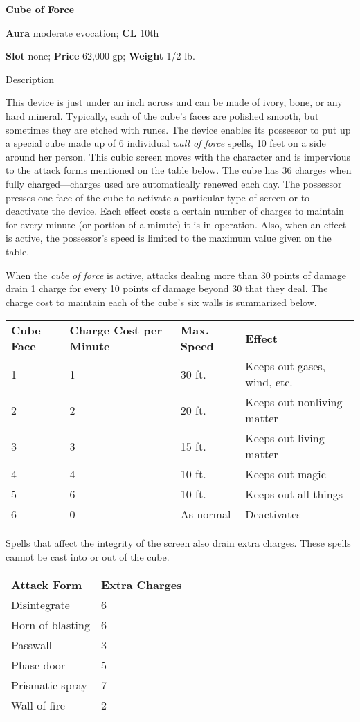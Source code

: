 \textbf{Cube of Force}
				
\textbf{Aura} moderate evocation;\textbf{ CL }10th
				
\textbf{Slot} none; \textbf{Price} 62,000 gp; \textbf{Weight }1/2 lb.
				
Description
				
This device is just under an inch across and can be made of ivory, bone, or any hard mineral. Typically, each of the cube's faces are polished smooth, but sometimes they are etched with runes. The device enables its possessor to put up a special cube made up of 6 individual \textit{wall of force }spells, 10 feet on a side around her person. This cubic screen moves with the character and is impervious to the attack forms mentioned on the table below. The cube has 36 charges when fully charged---charges used are automatically renewed each day. The possessor presses one face of the cube to activate a particular type of screen or to deactivate the device. Each effect costs a certain number of charges to maintain for every minute (or portion of a minute) it is in operation. Also, when an effect is active, the possessor's speed is limited to the maximum value given on the table.
				
When the \textit{cube of force }is active, attacks dealing more than 30 points of damage drain 1 charge for every 10 points of damage beyond 30 that they deal. The charge cost to maintain each of the cube's six walls is summarized below.

\begin{tabular}{llll}
\textbf{Cube Face} & \textbf{Charge Cost per Minute} & \textbf{Max. Speed} & \textbf{Effect}\\
1 & 1 & 30 ft. & Keeps out gases, wind, etc.\\
2 & 2 & 20 ft. & Keeps out nonliving matter\\
3 & 3 & 15 ft. & Keeps out living matter\\
4 & 4 & 10 ft. & Keeps out magic\\
5 & 6 & 10 ft. & Keeps out all things\\
6 & 0 & As normal & Deactivates\\
\end{tabular}
				
Spells that affect the integrity of the screen also drain extra charges. These spells cannot be cast into or out of the cube. 
\begin{tabular}{ll}
\textbf{Attack Form} & \textbf{Extra Charges}\\
Disintegrate & 6\\
Horn of blasting & 6\\
Passwall & 3\\
Phase door & 5\\
Prismatic spray & 7 \\
Wall of fire & 2\\
\end{tabular}
				
